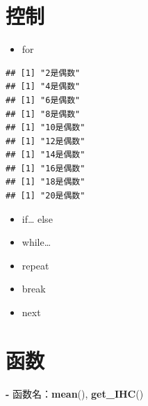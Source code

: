 \documentclass[]{book}
\newenvironment{Shaded}{\begin{snugshade}}{\end{snugshade}}
\newcommand{\ControlFlowTok}[1]{\textcolor[rgb]{0.13,0.29,0.53}{\textbf{#1}}}
\newcommand{\DataTypeTok}[1]{\textcolor[rgb]{0.13,0.29,0.53}{#1}}
\newcommand{\DecValTok}[1]{\textcolor[rgb]{0.00,0.00,0.81}{#1}}
\newcommand{\KeywordTok}[1]{\textcolor[rgb]{0.13,0.29,0.53}{\textbf{#1}}}
\newcommand{\NormalTok}[1]{#1}
\newcommand{\OperatorTok}[1]{\textcolor[rgb]{0.81,0.36,0.00}{\textbf{#1}}}
\newcommand{\StringTok}[1]{\textcolor[rgb]{0.31,0.60,0.02}{#1}}
\providecommand{\tightlist}{%
  \setlength{\itemsep}{0pt}\setlength{\parskip}{0pt}}
\begin{document}
\hypertarget{section-5}{%
\section{控制}\label{section-5}}

\begin{itemize}
\tightlist
\item
  for
\end{itemize}

\begin{Shaded}
\end{Shaded}

\begin{verbatim}
## [1] "2是偶数"
## [1] "4是偶数"
## [1] "6是偶数"
## [1] "8是偶数"
## [1] "10是偶数"
## [1] "12是偶数"
## [1] "14是偶数"
## [1] "16是偶数"
## [1] "18是偶数"
## [1] "20是偶数"
\end{verbatim}

\begin{itemize}
\tightlist
\item
  if\ldots{} else
\item
  while\ldots{}
\item
  repeat
\item
  break
\item
  next
\end{itemize}

\hypertarget{section-6}{%
\section{函数}\label{section-6}}

\begin{Shaded}
\begin{Highlighting}[]
\OperatorTok{-}\StringTok{ }\NormalTok{函数名：}\KeywordTok{mean}\NormalTok{(), }\KeywordTok{get_IHC}\NormalTok{()}
\end{Highlighting}
\end{Shaded}
\end{document}
